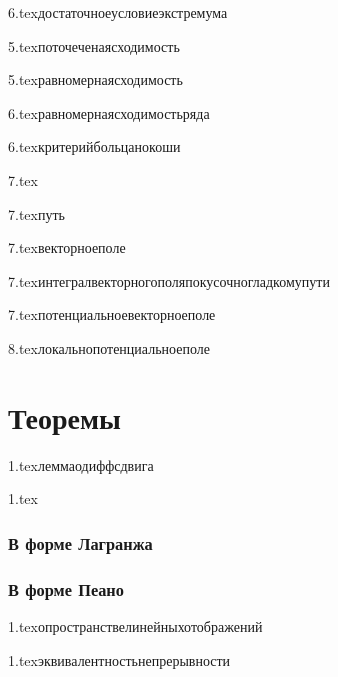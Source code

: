 {6.tex}{достаточноеусловиеэкстремума}

{5.tex}{поточеченаясходимость}

{5.tex}{равномернаясходимость}

{6.tex}{равномернаясходимостьряда}

{6.tex}{критерийбольцанокоши}

{7.tex}{}

{7.tex}{путь}


{7.tex}{векторноеполе}

{7.tex}{интегралвекторногополяпокусочногладкомупути}

{7.tex}{потенциальноевекторноеполе}

{8.tex}{локальнопотенциальноеполе}

\section{Теоремы}

{1.tex}{леммаодиффсдвига}

{1.tex}{}
\subsubsection{В форме Лагранжа}
\subsubsection{В форме Пеано}

{1.tex}{опространствелинейныхотображений}

{1.tex}{эквивалентностьнепрерывности}

